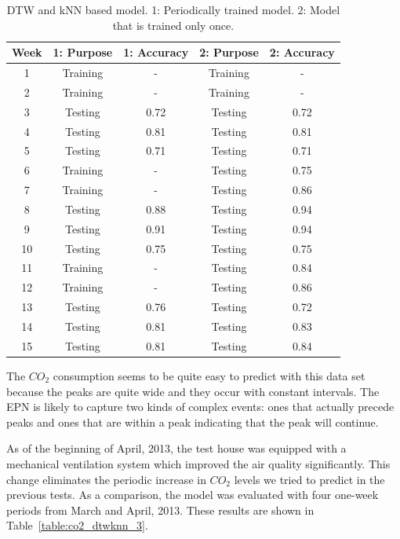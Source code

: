 \begin{table}
  \caption{DTW and kNN based model. 1: Periodically trained model. 2: Model that is trained only once.} 
  \begin{tabular}{ c | c | c | c | c }
    \hline
   	\textbf{Week} & \textbf{1: Purpose} & \textbf{1: Accuracy} & \textbf{2: Purpose} & \textbf{2: Accuracy} \\
	\hline
	1 & Training & - & Training & - \\
	2 & Training & - & Training & - \\
	3 & Testing & 0.72 & Testing & 0.72 \\
	4 & Testing & 0.81 & Testing & 0.81 \\
	5 & Testing & 0.71 & Testing & 0.71 \\
	6 & Training & - & Testing & 0.75 \\
	7 & Training & - & Testing & 0.86 \\
	8 & Testing & 0.88 & Testing & 0.94 \\
	9 & Testing & 0.91 & Testing & 0.94 \\
	10 & Testing & 0.75 & Testing & 0.75 \\
	11 & Training & - & Testing & 0.84 \\
	12 & Training & - & Testing & 0.86 \\
	13 & Testing & 0.76 & Testing & 0.72 \\
	14 & Testing & 0.81 & Testing & 0.83 \\
	15 & Testing & 0.81 & Testing & 0.84 \\
	\hline
  \end{tabular}
  \label{table:co2_dtwknn_2}
\end{table}

The $CO_2$ consumption seems to be quite easy to predict with this data set because the peaks are quite wide and they occur with constant intervals. The EPN is likely to capture two kinds of complex events: ones that actually precede peaks and ones that are within a peak indicating that the peak will continue.

As of the beginning of April, 2013, the test house was equipped with a mechanical ventilation system which improved the air quality significantly. This change eliminates the periodic increase in $CO_2$ levels we tried to predict in the previous tests. As a comparison, the model was evaluated with four one-week periods from March and April, 2013. These results are shown in Table~\ref{table:co2_dtwknn_3}.

